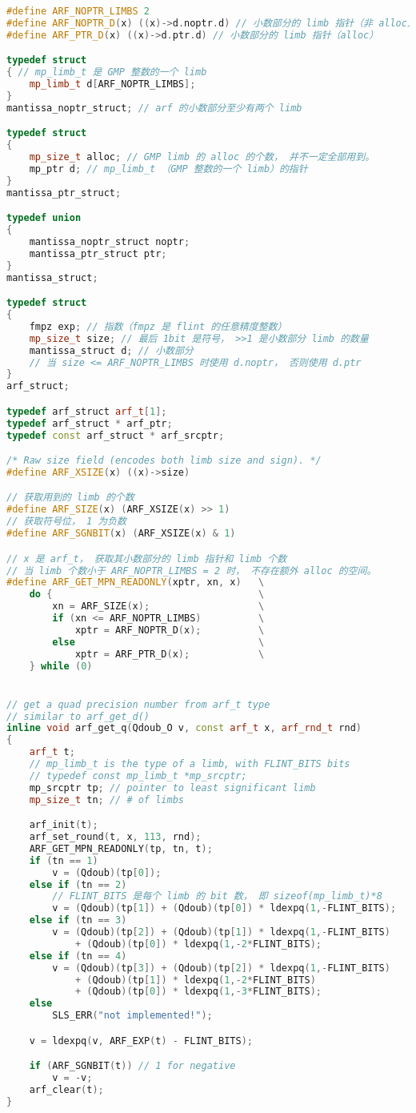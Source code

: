 \begin{lstlisting}[language=cpp]
#define ARF_NOPTR_LIMBS 2
#define ARF_NOPTR_D(x) ((x)->d.noptr.d) // 小数部分的 limb 指针（非 alloc）
#define ARF_PTR_D(x) ((x)->d.ptr.d) // 小数部分的 limb 指针（alloc）

typedef struct
{ // mp_limb_t 是 GMP 整数的一个 limb
    mp_limb_t d[ARF_NOPTR_LIMBS];
}
mantissa_noptr_struct; // arf 的小数部分至少有两个 limb

typedef struct
{
    mp_size_t alloc; // GMP limb 的 alloc 的个数， 并不一定全部用到。
    mp_ptr d; // mp_limb_t （GMP 整数的一个 limb）的指针
}
mantissa_ptr_struct;

typedef union
{
    mantissa_noptr_struct noptr;
    mantissa_ptr_struct ptr;
}
mantissa_struct;

typedef struct
{
    fmpz exp; // 指数（fmpz 是 flint 的任意精度整数）
    mp_size_t size; // 最后 1bit 是符号， >>1 是小数部分 limb 的数量
    mantissa_struct d; // 小数部分
	// 当 size <= ARF_NOPTR_LIMBS 时使用 d.noptr， 否则使用 d.ptr
}
arf_struct;

typedef arf_struct arf_t[1];
typedef arf_struct * arf_ptr;
typedef const arf_struct * arf_srcptr;

/* Raw size field (encodes both limb size and sign). */
#define ARF_XSIZE(x) ((x)->size)

// 获取用到的 limb 的个数
#define ARF_SIZE(x) (ARF_XSIZE(x) >> 1)
// 获取符号位， 1 为负数
#define ARF_SGNBIT(x) (ARF_XSIZE(x) & 1)

// x 是 arf_t， 获取其小数部分的 limb 指针和 limb 个数
// 当 limb 个数小于 ARF_NOPTR_LIMBS = 2 时， 不存在额外 alloc 的空间。
#define ARF_GET_MPN_READONLY(xptr, xn, x)   \
    do {                                    \
        xn = ARF_SIZE(x);                   \
        if (xn <= ARF_NOPTR_LIMBS)          \
            xptr = ARF_NOPTR_D(x);          \
        else                                \
            xptr = ARF_PTR_D(x);            \
    } while (0)


// get a quad precision number from arf_t type
// similar to arf_get_d()
inline void arf_get_q(Qdoub_O v, const arf_t x, arf_rnd_t rnd)
{
	arf_t t;
	// mp_limb_t is the type of a limb, with FLINT_BITS bits
	// typedef const mp_limb_t *mp_srcptr;
	mp_srcptr tp; // pointer to least significant limb
	mp_size_t tn; // # of limbs

	arf_init(t);
	arf_set_round(t, x, 113, rnd);
	ARF_GET_MPN_READONLY(tp, tn, t);
	if (tn == 1)
		v = (Qdoub)(tp[0]);
	else if (tn == 2)
	    // FLINT_BITS 是每个 limb 的 bit 数， 即 sizeof(mp_limb_t)*8
		v = (Qdoub)(tp[1]) + (Qdoub)(tp[0]) * ldexpq(1,-FLINT_BITS);
	else if (tn == 3)
		v = (Qdoub)(tp[2]) + (Qdoub)(tp[1]) * ldexpq(1,-FLINT_BITS)
		    + (Qdoub)(tp[0]) * ldexpq(1,-2*FLINT_BITS);
	else if (tn == 4)
		v = (Qdoub)(tp[3]) + (Qdoub)(tp[2]) * ldexpq(1,-FLINT_BITS)
		    + (Qdoub)(tp[1]) * ldexpq(1,-2*FLINT_BITS)
			+ (Qdoub)(tp[0]) * ldexpq(1,-3*FLINT_BITS);
	else
		SLS_ERR("not implemented!");

	v = ldexpq(v, ARF_EXP(t) - FLINT_BITS);

	if (ARF_SGNBIT(t)) // 1 for negative
		v = -v;
	arf_clear(t);
}
\end{lstlisting}

